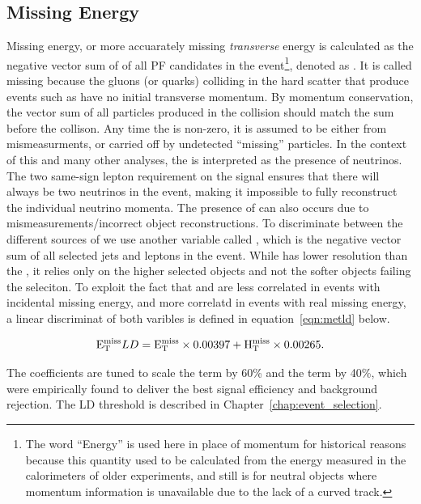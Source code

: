 \subsection{Missing Energy}
Missing energy, or more accuarately missing \emph{transverse} energy is calculated as the negative vector sum of \pt of all PF candidates in the event\footnote{The word ``Energy'' is used here in place of momentum
for historical reasons because this quantity used to be calculated from the energy measured in the calorimeters of older experiments, and still is for neutral objects where momentum information is unavailable due to the
lack of a curved track.}, denoted as \met. It is called missing because
the gluons (or quarks) colliding in the hard scatter that produce events such as \tth have no initial transverse momentum. By momentum conservation, the vector sum of all particles
produced in the collision should match the sum before the collison. Any time the \met is non-zero, it is assumed to be either from mismeasurments, or carried off by undetected ``missing'' particles.
In the context of this and many other analyses, the \met is interpreted as the presence of neutrinos. The two same-sign lepton requirement on the signal ensures that there will always be two neutrinos in the event, making it impossible to fully
reconstruct the individual neutrino momenta. The presence of \met can also occurs due to mismeasurements/incorrect object reconstructions. To discriminate
between the different sources of \met we use another variable called \HT, which is the negative vector sum of all selected jets and leptons in the event. While \HT has lower resolution than the \met,
it relies only on the higher \pt selected objects and not the softer objects failing the seleciton. To exploit the fact that \HT and \met are less correlated in events with incidental missing energy,
and more correlatd in events with real missing energy, a linear discriminat of both varibles is defined in equation~\ref{eqn:metld} below.

\begin{equation}
\label{eqn:metld}
 \mathrm{E}^{\mathrm{miss}}_{\mathrm{T}} LD = \mathrm{E}^{\mathrm{miss}}_{\mathrm{T}}\times0.00397 + \mathrm{H}^{\mathrm{miss}}_{\mathrm{T}}\times0.00265.
\end{equation}

\noindent The coefficients are tuned to scale the \met term by 60\% and the \HT term by 40\%, which were empirically found to deliver the best signal efficiency and background rejection.
The \met LD threshold is described in Chapter~\ref{chap:event_selection}.

